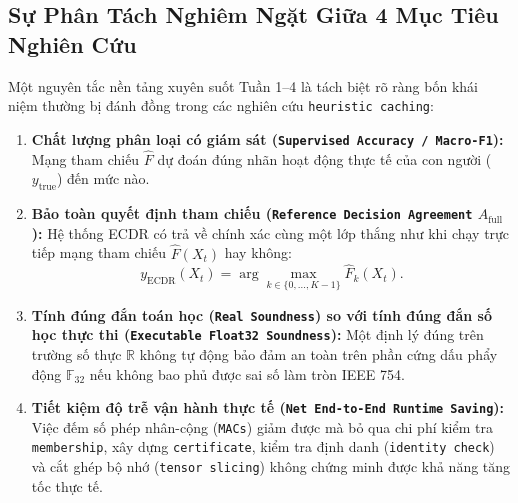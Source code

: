 \documentclass[11pt,a4paper]{article}
\newcommand{\R}{\mathbb{R}}
\newcommand{\F}{\mathbb{F}}
\newcommand{\code}[1]{{\small\ttfamily\nolinkurl{#1}}}
\theoremstyle{remark}
\begin{document}
\subsection{Sự Phân Tách Nghiêm Ngặt Giữa 4 Mục Tiêu Nghiên Cứu}
Một nguyên tắc nền tảng xuyên suốt Tuần 1--4 là tách biệt rõ ràng bốn khái niệm thường bị đánh đồng trong các nghiên cứu \code{heuristic caching}:
\begin{enumerate}
  \item \textbf{Chất lượng phân loại có giám sát (\code{Supervised Accuracy / Macro-F1}):} Mạng tham chiếu $\widehat{F}$ dự đoán đúng nhãn hoạt động thực tế của con người ($y_{\text{true}}$) đến mức nào.
  \item \textbf{Bảo toàn quyết định tham chiếu (\code{Reference Decision Agreement} $A_{\text{full}}$):} Hệ thống ECDR có trả về chính xác cùng một lớp thắng như khi chạy trực tiếp mạng tham chiếu $\widehat{F}(X_t)$ hay không:
  \begin{equation}
    y_{\text{ECDR}}(X_t) = \arg\max_{k \in \{0,\dots,K-1\}} \widehat{F}_k(X_t).
  \end{equation}
  \item \textbf{Tính đúng đắn toán học (\code{Real Soundness}) so với tính đúng đắn số học thực thi (\code{Executable Float32 Soundness}):} Một định lý đúng trên trường số thực $\R$ không tự động bảo đảm an toàn trên phần cứng dấu phẩy động $\F_{32}$ nếu không bao phủ được sai số làm tròn IEEE 754.
  \item \textbf{Tiết kiệm độ trễ vận hành thực tế (\code{Net End-to-End Runtime Saving}):} Việc đếm số phép nhân-cộng (\code{MACs}) giảm được mà bỏ qua chi phí kiểm tra \code{membership}, xây dựng \code{certificate}, kiểm tra định danh (\code{identity check}) và cắt ghép bộ nhớ (\code{tensor slicing}) không chứng minh được khả năng tăng tốc thực tế.
\end{enumerate}
\end{document}
